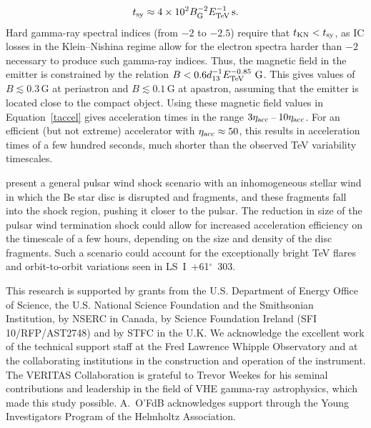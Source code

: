 \documentclass[preprint2]{aastex}
\newcommand{\lsi}{LS~I~+61$^{\circ}$~303}
\begin{document}
\begin{equation}
t_{\mbox{\scriptsize{sy}}} \approx 4\times10^2 B_{\mbox{\scriptsize{G}}}^{-2} E_{\mbox{\scriptsize{TeV}}}^{-1} \mbox{\,s}.
\end{equation}
Hard gamma-ray spectral indices (from $-2$ to $-2.5$) require that $t_{\mbox{\scriptsize{KN}}} < t_{\mbox{\scriptsize{sy}}}$, as IC losses in the Klein--Nishina regime allow for the electron spectra harder than $-2$ necessary to produce such gamma-ray indices. Thus, the magnetic field in the emitter is constrained by the relation
 ${B < 0.6 d_{13}^{-1} E_{\mbox{\scriptsize{TeV}}}^{-0.85} \,\mbox{\,G}}$.
This gives values of $B \lesssim 0.3$\,G at periastron and $B \lesssim 0.1$\,G at apastron, assuming that the emitter is located close to the compact object. Using these magnetic field values in Equation~\ref{taccel} gives acceleration times in the range $3 \eta_{\mbox{\scriptsize{acc}}}$\,--\,$10 \eta_{\mbox{\scriptsize{acc}}}$. For an efficient (but not extreme) accelerator with $\eta_{\mbox{\scriptsize{acc}}} \approx 50$, this results in acceleration times of a few hundred seconds, much shorter than the observed TeV variability timescales.

\citet{Paredes-Fortuny2014} present a general pulsar wind shock scenario with an inhomogeneous stellar wind in which the Be star disc is disrupted and fragments, and these fragments fall into the shock region, pushing it closer to the pulsar. The reduction in size of the pulsar wind termination shock could allow for increased acceleration efficiency on the timescale of a few hours, depending on the size and density of the disc fragments. Such a scenario could account for the exceptionally bright TeV flares and orbit-to-orbit variations seen in \lsi{}.
\vspace{2ex}

\small{
This research is supported by grants from the U.S. Department of Energy Office of Science, the U.S. National Science Foundation and the Smithsonian Institution, by NSERC in Canada, by Science Foundation Ireland (SFI 10/RFP/AST2748) and by STFC in the U.K. We acknowledge the excellent work of the technical support staff at the Fred Lawrence Whipple Observatory and at the collaborating institutions in the construction and operation of the instrument. The VERITAS Collaboration is grateful to Trevor Weekes for his seminal contributions and leadership in the field of VHE gamma-ray astrophysics, which made this study possible. A.\ O'FdB acknowledges support through the Young Investigators Program of the Helmholtz Association.
}


\end{document}
